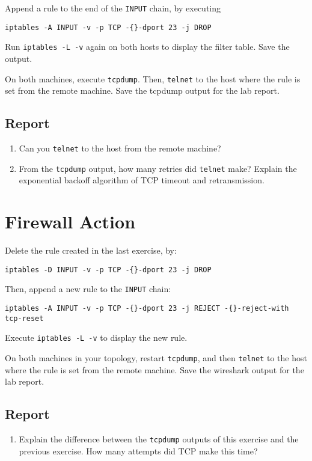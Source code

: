 \documentclass{../UTNetLab}
\begin{document}
    Append a rule to the end of the \texttt{INPUT} chain, by executing
    \begin{lstlisting}
iptables -A INPUT -v -p TCP -{}-dport 23 -j DROP
    \end{lstlisting}
    
    Run \lstinline{iptables -L -v} again on both hosts to display the filter table. Save the output.

    On both machines, execute \lstinline{tcpdump}. Then, \lstinline{telnet} to the host where the rule is set from the remote machine. Save the tcpdump output for the lab report.

    \subsection*{Report}
    \begin{enumerate}
        \item Can you \lstinline{telnet} to the host from the remote machine?
        \item From the \lstinline{tcpdump} output, how many retries did \lstinline{telnet} make? Explain the exponential backoff algorithm of TCP timeout and retransmission.
    \end{enumerate}
    
\section{Firewall Action}
    Delete the rule created in the last exercise, by:    
    \begin{lstlisting}
iptables -D INPUT -v -p TCP -{}-dport 23 -j DROP
    \end{lstlisting}
    
    Then, append a new rule to the \texttt{INPUT} chain:    
    \begin{lstlisting}
iptables -A INPUT -v -p TCP -{}-dport 23 -j REJECT -{}-reject-with tcp-reset
    \end{lstlisting}
    
    Execute \lstinline{iptables -L -v} to display the new rule.

    On both machines in your topology, restart \lstinline{tcpdump}, and then \lstinline{telnet} to the host where the rule is set from the remote machine. Save the wireshark output for the lab report.
    
    \subsection*{Report}
    \begin{enumerate}
        \setlength{\itemindent}{0pt}
        \item Explain the difference between the \lstinline{tcpdump} outputs of this exercise and the previous exercise. How many attempts did {TCP} make this time?
    \end{enumerate}
\end{document}
